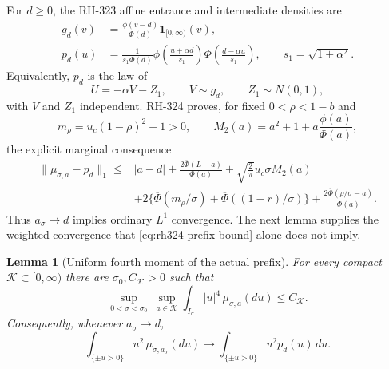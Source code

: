 \documentclass[11pt]{article}
\newtheorem{lemma}[theorem]{Lemma}
\theoremstyle{definition}
\theoremstyle{remark}
\newcommand{\1}{\mathbf 1}
\begin{document}
For $d\ge0$, the RH-323 affine entrance and intermediate densities are
\begin{align}
 g_d(v)&=\frac{\phi(v-d)}{\Phi(d)}\1_{[0,\infty)}(v),
 \label{eq:gd}\\
 p_d(u)&=\frac1{s_1\Phi(d)}
 \phi\!\left(\frac{u+\alpha d}{s_1}\right)
 \Phi\!\left(\frac{d-\alpha u}{s_1}\right),
 \qquad s_1=\sqrt{1+\alpha^2}.
 \label{eq:pd}
\end{align}
Equivalently, $p_d$ is the law of
\begin{equation}\label{eq:affine-U}
 U=-\alpha V-Z_1,
 \qquad V\sim g_d,
 \qquad Z_1\sim N(0,1),
\end{equation}
with $V$ and $Z_1$ independent.  RH-324 proves, for fixed
$0<\rho<1-b$ and
\[
 m_\rho=u_c(1-\rho)^2-1>0,
 \qquad
 M_2(a)=a^2+1+a\frac{\phi(a)}{\Phi(a)},
\]
the explicit marginal consequence
\begin{align}
 \|\mu_{\sigma,a}-p_d\|_1
 \le{}&|a-d|+
 \frac{2\overline\Phi(L-a)}{\Phi(a)}
 +\sqrt{\frac2\pi}u_c\sigma M_2(a)\nonumber\\
 &+2\{\overline\Phi(m_\rho/\sigma)
       +\overline\Phi((1-r)/\sigma)\}
 +\frac{2\overline\Phi(\rho/\sigma-a)}{\Phi(a)}.
 \label{eq:rh324-prefix-bound}
\end{align}
Thus $a_\sigma\to d$ implies ordinary $L^1$ convergence.  The next lemma
supplies the weighted convergence that \eqref{eq:rh324-prefix-bound} alone
does not imply.

\begin{lemma}[Uniform fourth moment of the actual prefix]
\label{lem:fourth-moment}
For every compact $\mathcal K\subset[0,\infty)$ there are
$\sigma_0,C_{\mathcal K}>0$ such that
\begin{equation}\label{eq:uniform-fourth}
 \sup_{0<\sigma<\sigma_0}\ \sup_{a\in\mathcal K}
 \int_{I_\sigma}|u|^4\,\mu_{\sigma,a}(du)
 \le C_{\mathcal K}.
\end{equation}
Consequently, whenever $a_\sigma\to d$,
\begin{equation}\label{eq:sector-moment-convergence}
 \int_{\{\pm u>0\}}u^2\,\mu_{\sigma,a_\sigma}(du)
 \longrightarrow
 \int_{\{\pm u>0\}}u^2p_d(u)\,du.
\end{equation}
\end{lemma}
\end{document}
